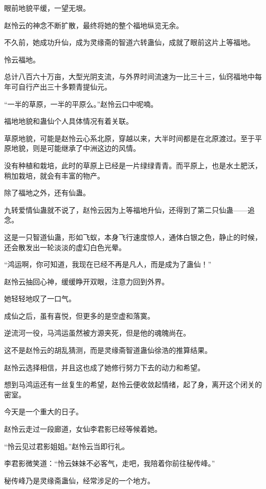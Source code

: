 
\begin{this_body}

眼前地貌平缓，一望无垠。

赵怜云的神念不断扩散，最终将她的整个福地纵览无余。

不久前，她成功升仙，成为灵缘斋的智道六转蛊仙，成就了眼前这片上等福地。

怜云福地。

总计八百六十万亩，大型光阴支流，与外界时间流速为一比三十三，仙窍福地中每年可自行产出三十多颗青提仙元。

“一半的草原，一半的平原么。”赵怜云口中呢喃。

福地地貌和蛊仙个人具体情况有着关联。

草原地貌，可能是赵怜云心系北原，穿越以来，大半时间都是在北原渡过。至于平原地貌，则是可能继承了中洲这边的风情。

没有种植和栽培，此时的草原上已经是一片绿绿青青。而平原上，也是水土肥沃，稍加栽培，就会有丰富的物产。

除了福地之外，还有仙蛊。

九转爱情仙蛊就不说了，赵怜云因为上等福地升仙，还得到了第二只仙蛊——追念。

这是一只智道仙蛊，形如飞蚁，本身飞行速度惊人，通体白银之色，静止的时候，还会散发出一轮淡淡的虚幻白色光晕。

“鸿运啊，你可知道，我现在已经不再是凡人，而是成为了蛊仙！”

赵怜云抽回心神，缓缓睁开双眼，注意力回到外界。

她轻轻地叹了一口气。

成仙之后，虽有喜悦，但更多的是空虚和落寞。

逆流河一役，马鸿运虽然被方源夹死，但是他的魂魄尚在。

这不是赵怜云的胡乱猜测，而是灵缘斋智道蛊仙徐浩的推算结果。

赵怜云选择相信，并且这也成了她修行努力下去的动力和希望。

想到马鸿运还有一丝复生的希望，赵怜云便收敛起情绪，起了身，离开这个闭关的密室。

今天是一个重大的日子。

赵怜云走过一段廊道，女仙李君影已经等候着她。

“怜云见过君影姐姐。”赵怜云当即行礼。

李君影微笑道：“怜云妹妹不必客气，走吧，我陪着你前往秘传峰。”

秘传峰乃是灵缘斋蛊仙，经常涉足的一个地方。


\end{this_body}
